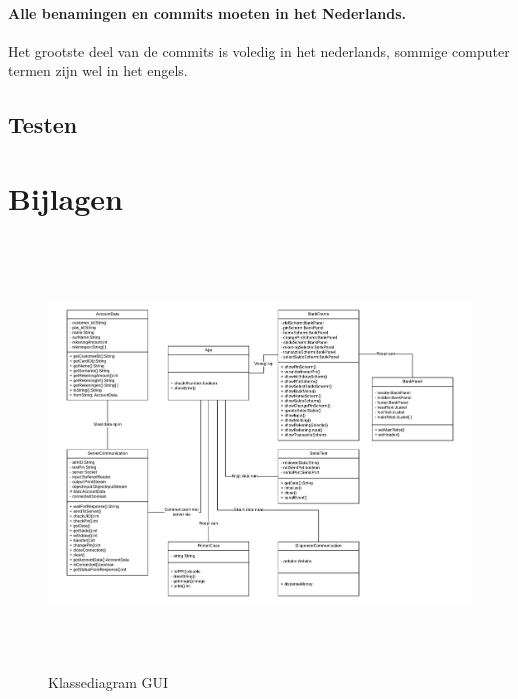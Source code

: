\documentclass{article}
\begin{document}
\paragraph{Alle benamingen en commits moeten in het Nederlands.}
Het grootste deel van de commits is voledig in het nederlands, sommige computer termen zijn wel in het engels.

\subsection{Testen}


\newpage
\section{Bijlagen}

\begin{figure}[H]
       \centering
       \includegraphics[height=4.5in]{Klassediagram.pdf}
       \caption{Klassediagram GUI}
       \label{fig: Klassediagram GUI}
\end{figure}
\end{document}
